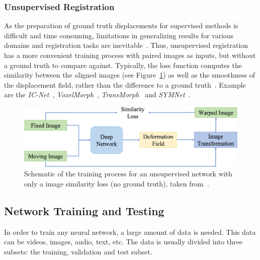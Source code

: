 \subsubsection{Unsupervised Registration} \label{SubSubSec:UnsupervisedRegistration}
As the preparation of ground truth displacements for supervised methods is difficult and time consuming, limitations in generalizing results for various domains and registration tasks are inevitable~\cite{Chen2023}. Thus, unsupervised registration has a more convenient training process with paired images as inputs, but without a ground truth to compare against. Typically, the loss function computes the similarity between the aligned images (see Figure~\ref{fig:UnsupervisedRegistration}) as well as the smoothness of the displacement field, rather than the difference to a ground truth~\cite{Zou2022}. Example are the \emph{IC-Net}~\cite{IC-Net},  \emph{VoxelMorph}~\cite{Voxelmorph}, \emph{TransMorph}~\cite{TransMorph} and \emph{SYMNet}~\cite{SYM-Net}.

\begin{figure}[h] %
	\centering
	\graphicspath{{images/}{\main/images/}}
	\includegraphics[width=\linewidth]{UnsupervisedRegistrationGraph.jpg} 
	\caption{Schematic of the training process for an unsupervised network with only a image similarity loss (no ground truth), taken from~\cite{Zou2022}.}
	\label{fig:UnsupervisedRegistration}
\end{figure}


\subsection{Network Training and Testing} \label{SubSec:NetworkTrainingAndTesting}
In order to train any neural network, a large amount of data is needed. This data can be videos, images, audio, text, etc. The data is usually divided into three subsets: the training, validation and test subset. 

